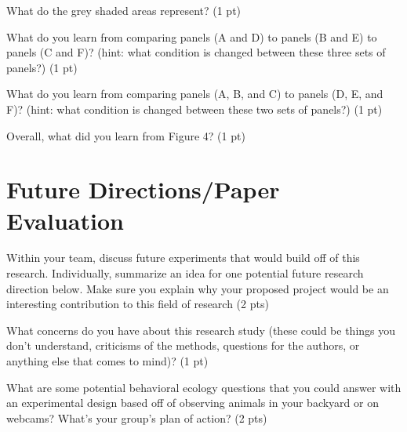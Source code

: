 \documentclass[12pt,a4paper]{article}
\begin{document}
\begin{enumerate}[font=\bfseries, wide, resume]
    
    {\color{under}\item What do the grey shaded areas represent? (1 pt)}
    
    
    {\color{under}\item What do you learn from comparing panels (A and D) to panels (B and E) to panels (C and F)? (hint: what condition is changed between these three sets of panels?) (1 pt)}


    {\color{under}\item What do you learn from comparing panels (A, B, and C) to panels (D, E, and F)? (hint: what condition is changed between these two sets of panels?) (1 pt)}
    
    
    {\color{under}\item  Overall, what did you learn from Figure 4? (1 pt)}
\end{enumerate}
    
\section*{Future Directions/Paper Evaluation}
\begin{enumerate}[font=\bfseries, wide, resume]
    {\color{under}\item  Within your team, discuss future experiments that would build off of this research. Individually, summarize an idea for one potential future research direction below. Make sure you explain why your proposed project would be an interesting contribution to this field of research (2 pts)}
    
    
    {\color{under}\item What concerns do you have about this research study (these could be things you don’t understand, criticisms of the methods, questions for the authors, or anything else that comes to mind)? (1 pt)}
    
    
    {\color{under}\item  What are some potential behavioral ecology questions that you could answer with an experimental design based off of observing animals in your backyard or on webcams? What’s your group's plan of action? (2 pts)}  
\end{enumerate}
\end{document}
